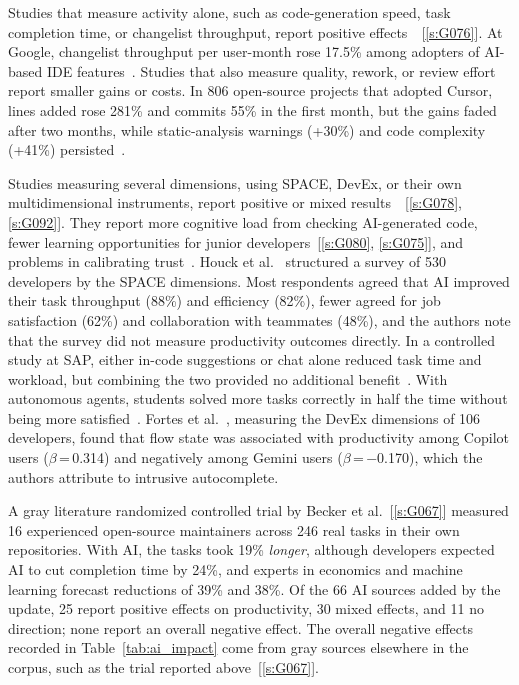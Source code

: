 \documentclass[preprint,number]{elsarticle}
\newcounter{study}
\newcommand{\refG}[1]{\ref{s:#1}}
\begin{document}
Studies that measure activity alone, such as code-generation speed, task completion time, or changelist throughput, report positive effects~\cite{P0549, P2029}~[\refG{G076}]. At Google, changelist throughput per user-month rose 17.5\% among adopters of AI-based IDE features~\cite{P2029}. Studies that also measure quality, rework, or review effort report smaller gains or costs. In 806 open-source projects that adopted Cursor, lines added rose 281\% and commits 55\% in the first month, but the gains faded after two months, while static-analysis warnings (+30\%) and code complexity (+41\%) persisted~\cite{P2032}.

Studies measuring several dimensions, using SPACE, DevEx, or their own multidimensional instruments, report positive or mixed results~\cite{P0244, P1303, P1402, P2019, P2020, P2025}~[\refG{G078}, \refG{G092}]. They report more cognitive load from checking AI-generated code, fewer learning opportunities for junior developers~[\refG{G080}, \refG{G075}], and problems in calibrating trust~\cite{P1402}. Houck et al.~\cite{P2020} structured a survey of 530 developers by the SPACE dimensions. Most respondents agreed that AI improved their task throughput (88\%) and efficiency (82\%), fewer agreed for job satisfaction (62\%) and collaboration with teammates (48\%), and the authors note that the survey did not measure productivity outcomes directly. In a controlled study at SAP, either in-code suggestions or chat alone reduced task time and workload, but combining the two provided no additional benefit~\cite{P2019}. With autonomous agents, students solved more tasks correctly in half the time without being more satisfied~\cite{P2025}. Fortes et al.~\cite{P0244}, measuring the DevEx dimensions of 106 developers, found that flow state was associated with productivity among Copilot users ($\beta$\,=\,0.314) and negatively among Gemini users ($\beta$\,=\,$-$0.170), which the authors attribute to intrusive autocomplete.

A gray literature randomized controlled trial by Becker et al.~[\refG{G067}] measured 16 experienced open-source maintainers across 246 real tasks in their own repositories. With AI, the tasks took 19\% \textit{longer}, although developers expected AI to cut completion time by 24\%, and experts in economics and machine learning forecast reductions of 39\% and 38\%. Of the 66 AI sources added by the update, 25 report positive effects on productivity, 30 mixed effects, and 11 no direction; none report an overall negative effect. The overall negative effects recorded in Table~\ref{tab:ai_impact} come from gray sources elsewhere in the corpus, such as the trial reported above~[\refG{G067}].
\end{document}
